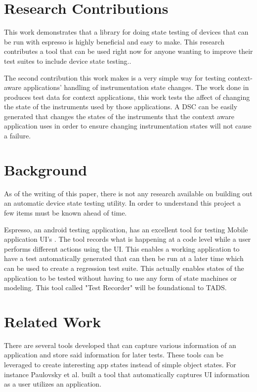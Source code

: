 \section{Research Contributions}
This work demonstrates that a library for doing state testing of devices that can be run with espresso is highly beneficial and easy to make.  This research contributes a tool that can be used right now for anyone wanting to improve their test suites to include device state testing.. 

The second contribution this work makes is a very simple way for testing context-aware applications' handling of instrumentation state changes. The work done in \cite{Luo:2017:TLT:3139486.3130945} produces test data for context applications, this work tests the affect of changing the state of the instruments used by those applications.  A DSC can be easily generated that changes the states of the instruments that the context aware application uses in order to ensure changing instrumentation states will not cause a failure. 

\section{Background}
As of the writing of this paper, there is not any research available on building out an automatic device state testing utility.  In order to understand this project a few items must be known ahead of time.  

Espresso, an android testing application, has an excellent tool for testing Mobile application UI's \cite{nolan2015agile}.  The tool records what is happening at a code level while a user performs different actions using the UI.  This enables a working application to have a test automatically generated that can then be run at a later time which can be used to create a regression test suite.  This actually enables states of the application to be tested without having to use any form of state machines or modeling.  This tool called "Test Recorder" will be foundational to TADS. 


\section{Related Work}
There are several tools developed that can capture various information of an application and store said information for later tests.  These tools can be leveraged to create interesting app states instead of simple object states.  For instance Paulovsky et al. \cite{7962332} built a tool that automatically captures UI information as a user utilizes an application. 

